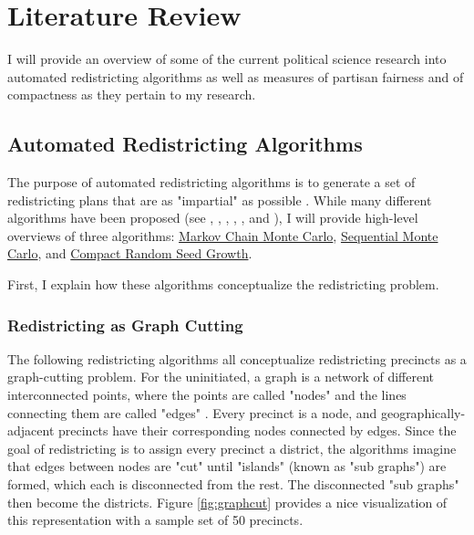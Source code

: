 \section{Literature Review}
\label{sec:litreview}

I will provide an overview of some of the current political science research into automated redistricting algorithms as well as measures of partisan fairness and of compactness as they pertain to my research. 

\subsection{Automated Redistricting Algorithms}

The purpose of automated redistricting algorithms is to generate a set of redistricting plans that are as "impartial" as possible \parencite{chen2013}. While many different algorithms have been proposed (see \textcite{altman2009}, \textcite{haas2020}, \textcite{lara-caballero2019}, \textcite{macmillan2001}, \textcite{weaver1963}, and \textcite{xiao2008}), I will provide high-level overviews of three algorithms: \hyperref[sec:mcmc]{Markov Chain Monte Carlo}, \hyperref[sec:smc]{Sequential Monte Carlo}, and \hyperref[sec:crsg]{Compact Random Seed Growth}. 

First, I explain how these algorithms conceptualize the redistricting problem. 

\subsubsection{Redistricting as Graph Cutting}
\label{sec:redistasgraphcut}

The following redistricting algorithms all conceptualize redistricting precincts as a graph-cutting problem. For the uninitiated, a graph is a network of different interconnected points, where the points are called "nodes" and the lines connecting them are called "edges" \parencite{fifield2020}. Every precinct is a node, and geographically-adjacent precincts have their corresponding nodes connected by edges. Since the goal of redistricting is to assign every precinct a district, the algorithms imagine that edges between nodes are "cut" until "islands" (known as "sub graphs") are formed, which each is disconnected from the rest. The disconnected "sub graphs" then become the districts. Figure \ref{fig:graphcut} provides a nice visualization of this representation with a sample set of 50 precincts\parencite{fifield2020}. 

